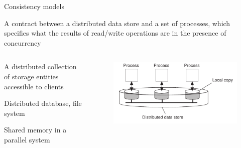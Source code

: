\begin{frame}{Consistency models}
	
\begin{definition}
A contract between a distributed data store and a set of processes, which 
specifies what the results of read/write operations are in the 
presence of concurrency
\end{definition}

\bigskip
\begin{columns}[t]

\begin{column}{0.52\textwidth}

\begin{definition}
A distributed collection of storage entities accessible to clients
{\footnotesize
\BI
\item Distributed database, file system
\item Shared memory in a parallel system
\EI
}
\end{definition}

\end{column}
\hfill
\begin{column}{0.43\textwidth}

\begin{figure}
\includegraphics[width=\textwidth]{figs/09/datastore}
\end{figure}

\end{column}

\end{columns}

\end{frame}

